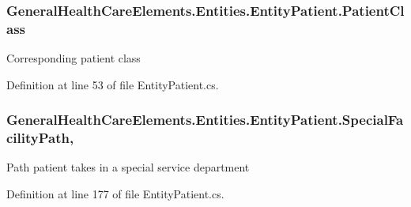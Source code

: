 \subsubsection[{\texorpdfstring{Patient\+Class}{PatientClass}}]{ General\+Health\+Care\+Elements.\+Entities.\+Entity\+Patient.\+Patient\+Class\hspace{0.3cm}{\ttfamily [get]}}\hypertarget{class_general_health_care_elements_1_1_entities_1_1_entity_patient_a4d31aabf4aca7707026b7f964c3463c1}{}\label{class_general_health_care_elements_1_1_entities_1_1_entity_patient_a4d31aabf4aca7707026b7f964c3463c1}


Corresponding patient class 



Definition at line 53 of file Entity\+Patient.\+cs.

\subsubsection[{\texorpdfstring{Special\+Facility\+Path}{SpecialFacilityPath}}]{ General\+Health\+Care\+Elements.\+Entities.\+Entity\+Patient.\+Special\+Facility\+Path\hspace{0.3cm}{\ttfamily [get]}, {\ttfamily [set]}}\hypertarget{class_general_health_care_elements_1_1_entities_1_1_entity_patient_a20145fb2d1bb970985056d7004791960}{}\label{class_general_health_care_elements_1_1_entities_1_1_entity_patient_a20145fb2d1bb970985056d7004791960}


Path patient takes in a special service department 



Definition at line 177 of file Entity\+Patient.\+cs.

